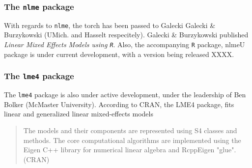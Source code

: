 \documentclass[12pt, a4paper]{report}
\theoremstyle{plain}
\theoremstyle{definition}
\theoremstyle{remark}
\begin{document}
\subsubsection*{The \texttt{nlme} package}

With regards to \texttt{nlme}, the torch has been passed to Galecki Galecki \& Burzykowski (UMich. and Hasselt respecitely).  Galecki \& Burzykowski published \textit{Linear Mixed Effects Models using \texttt{R}}. 
Also, the accompanying \texttt{R} package, nlmeU package is under current development, with a version being released XXXX.


\subsubsection*{The \texttt{lme4} package}

The \texttt{lme4} package is also under active development, under the leadership of Ben Bolker (McMaster University). According to CRAN, the LME4 package, fits linear and generalized linear mixed-effects models

\begin{quote}
	The models and their components are represented using S4 classes and methods. The core computational algorithms are implemented using the Eigen C++ library for numerical linear algebra and RcppEigen "glue".
	(CRAN)
\end{quote}

\end{document}
